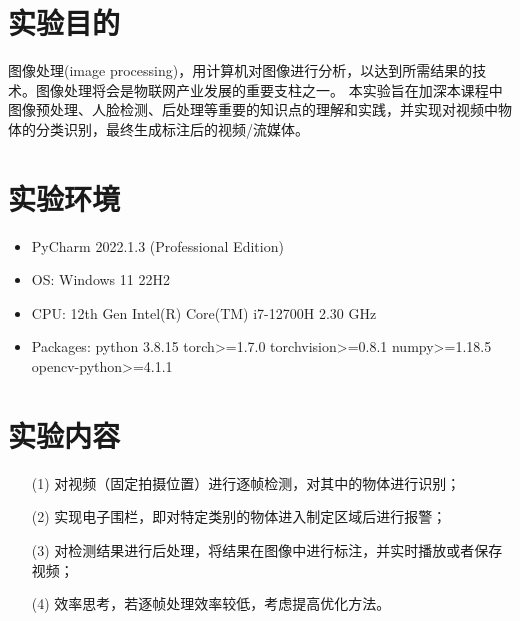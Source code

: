 \maketitle
\pagestyle{plain}%

%
%
%
%
\section{实验目的}
图像处理(image processing)，用计算机对图像进行分析，以达到所需结果的技术。图像处理将会是物联网产业发展的重要支柱之一。
本实验旨在加深本课程中图像预处理、人脸检测、后处理等重要的知识点的理解和实践，并实现对视频中物体的分类识别，最终生成标注后的视频/流媒体。
\section{实验环境}
\begin{itemize}
	\item PyCharm 2022.1.3 (Professional Edition)
	\item OS: Windows 11 22H2
	\item CPU: 12th Gen Intel(R) Core(TM) i7-12700H 2.30 GHz
	\item Packages: python 3.8.15 torch>=1.7.0 torchvision>=0.8.1 numpy>=1.18.5 opencv-python>=4.1.1
\end{itemize}
\section{实验内容}
\begin{enumerate}
	\item[(1)] 对视频（固定拍摄位置）进行逐帧检测，对其中的物体进行识别；
	\item[(2)] 实现电子围栏，即对特定类别的物体进入制定区域后进行报警；
	\item[(3)] 对检测结果进行后处理，将结果在图像中进行标注，并实时播放或者保存视频；
	\item[(4)] 效率思考，若逐帧处理效率较低，考虑提高优化方法。
\end{enumerate}

